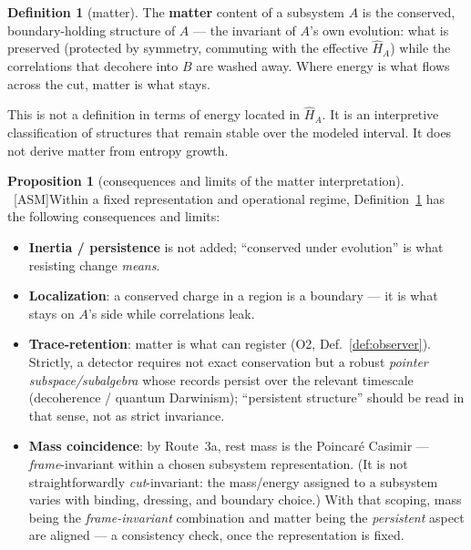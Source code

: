 \documentclass[11pt]{article}
\newcommand{\asm}{\textcolor{blue!70!black}{\textsf{\small[ASM]}}}
\theoremstyle{definition}
\newtheorem{definition}{Definition}[section]
\newtheorem{proposition}{Proposition}[section]
\theoremstyle{remark}
\begin{document}
\begin{definition}[matter]\label{def:matter}
The \textbf{matter} content of a subsystem $A$ is the conserved, boundary-holding structure of $A$ --- the invariant of $A$'s own evolution: what is preserved (protected by symmetry, commuting with the effective $\hat{H}_A$) while the correlations that decohere into $B$ are washed away. Where energy is what flows across the cut, matter is what stays.
\end{definition}

\noindent This is not a definition in terms of energy located in $\hat{H}_A$. It is an interpretive classification of structures that remain stable over the modeled interval. It does not derive matter from entropy growth.

\begin{proposition}[consequences and limits of the matter interpretation]{\normalfont\ \asm}\label{prop:matter}
Within a fixed representation and operational regime, Definition~\ref{def:matter} has the following consequences and limits:
\begin{itemize}[leftmargin=1.4em, itemsep=1pt, topsep=2pt]
  \item \textbf{Inertia / persistence} is not added; ``conserved under evolution'' is what resisting change \emph{means}.
  \item \textbf{Localization}: a conserved charge in a region is a boundary --- it is what stays on $A$'s side while correlations leak.
  \item \textbf{Trace-retention}: matter is what can register (O2, Def.~\ref{def:observer}). Strictly, a detector requires not exact conservation but a robust \emph{pointer subspace/subalgebra} whose records persist over the relevant timescale (decoherence / quantum Darwinism); ``persistent structure'' should be read in that sense, not as strict invariance.
  \item \textbf{Mass coincidence}: by Route~3a, rest mass is the Poincar\'e Casimir --- \emph{frame}-invariant within a chosen subsystem representation. (It is not straightforwardly \emph{cut}-invariant: the mass/energy assigned to a subsystem varies with binding, dressing, and boundary choice.) With that scoping, mass being the \emph{frame-invariant} combination and matter being the \emph{persistent} aspect are aligned --- a consistency check, once the representation is fixed.
\end{itemize}
\end{proposition}
\end{document}

